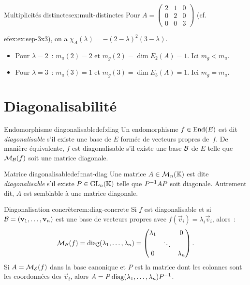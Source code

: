 \begin{example}{Multiplicités distinctes}{ex:mult-distinctes}
  Pour $A=\begin{pmatrix}2&1&0\\0&2&0\\0&0&3\end{pmatrix}$ (cf.\
  
ef{ex:ex:sep-3x3}), on a $\chi_A(\lambda)=-(2-\lambda)^2(3-\lambda)$.
  \begin{itemize}
    \item Pour $\lambda=2$~: $m_a(2)=2$ et $m_g(2)=\dim E_2(A)=1$.
      Ici $m_g<m_a$.
    \item Pour $\lambda=3$~: $m_a(3)=1$ et $m_g(3)=\dim E_3(A)=1$.
      Ici $m_g=m_a$.
  \end{itemize}
\end{example}

\section{Diagonalisabilité}\label{sec:diagonalisabilite}

\begin{definition}{Endomorphisme diagonalisable}{def:diag}
  Un endomorphisme $f\in\operatorname{End}(E)$ est dit \emph{diagonalisable} s'il
  existe une base de $E$ formée de vecteurs propres de~$f$. De manière
  équivalente, $f$ est diagonalisable s'il existe une base ${\mathcal{B}}$ de $E$
  telle que $\mathcal{M}_{\mathcal{B}}(f)$ soit une matrice diagonale.
\end{definition}

\begin{definition}{Matrice diagonalisable}{def:mat-diag}
  Une matrice $A\in\mathcal{M}_n({\mathbb{K}})$ est dite \emph{diagonalisable} s'il
  existe $P\in\operatorname{GL}_n({\mathbb{K}})$ telle que ${P}^{-1}AP$ soit diagonale.
  Autrement dit, $A$ est semblable à une matrice diagonale.
\end{definition}

\begin{remark}{Diagonalisation concrète}{rem:diag-concrete}
  Si $f$ est diagonalisable et si
  ${\mathcal{B}}=(\mathbf{v}_1,\ldots,\mathbf{v}_n)$ est une base de vecteurs propres
  avec $f(\vec{v}_i)=\lambda_i\vec{v}_i$, alors~:
  \[
    \mathcal{M}_{\mathcal{B}}(f)=\operatorname{diag}(\lambda_1,\ldots,\lambda_n)
    =\begin{pmatrix}\lambda_1&&0\\&\ddots&\\0&&\lambda_n\end{pmatrix}.
  \]
  Si $A=\mathcal{M}_{\mathcal{E}}(f)$ dans la base canonique et $P$ est la matrice dont
  les colonnes sont les coordonnées des $\vec{v}_i$, alors
  $A=P\operatorname{diag}(\lambda_1,\ldots,\lambda_n){P}^{-1}$.
\end{remark}

